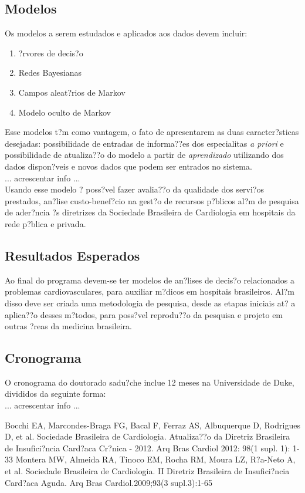 \documentclass{article}
\begin{document}
\subsection{ \label{subsec:modelos} Modelos}
Os modelos a serem estudados e aplicados aos dados devem incluir:
\begin{enumerate}
\item ?rvores de decis?o 
\item Redes Bayesianas 
\item Campos aleat?rios de Markov
\item Modelo oculto de Markov
\end{enumerate}
Esse modelos t?m como vantagem, o fato de apresentarem as duas caracter?sticas desejadas: possibilidade de entradas de informa??es dos especialitas \textit{a priori} e possibilidade de atualiza??o do modelo a partir de \textit{aprendizado} utilizando dos dados dispon?veis e novos dados que podem ser entrados no sistema.\\
{\color{red} ... acrescentar info ...}\\
Usando esse modelo ? poss?vel fazer avalia??o da qualidade dos servi?os prestados, an?lise custo-benef?cio na gest?o de recursos p?blicos al?m de pesquisa de ader?ncia ?s diretrizes da Sociedade Brasileira de Cardiologia em hospitais da rede p?blica e privada.

\subsection{ \label{sec:resultados} Resultados Esperados}
Ao final do programa devem-se ter modelos de an?lises de decis?o relacionados a problemas cardiovasculares, para auxiliar m?dicos em hospitais brasileiros. Al?m disso deve ser criada uma metodologia de pesquisa, desde as etapas iniciais at? a aplica??o desses m?todos, para poss?vel reprodu??o da pesquisa e projeto em outras ?reas da medicina brasileira.

\subsection{ \label{sec:cronograma} Cronograma}
O cronograma do doutorado sadu?che inclue 12 meses na Universidade de Duke, divididos da seguinte forma:\\
{\color{red} ... acrescentar info ...}


\clearpage

\begin{thebibliography}{9}
Bocchi EA, Marcondes-Braga FG, Bacal F, Ferraz AS, Albuquerque D, Rodrigues D, et al. Sociedade Brasileira de Cardiologia. Atualiza??o da Diretriz Brasileira de Insufici?ncia Card?aca Cr?nica - 2012. Arq Bras Cardiol 2012: 98(1 supl. 1): 1-33
Montera MW, Almeida RA, Tinoco EM, Rocha RM, Moura LZ, R?a-Neto A, et al.
Sociedade Brasileira de Cardiologia. II Diretriz Brasileira de Insufici?ncia Card?aca Aguda.
Arq Bras Cardiol.2009;93(3 supl.3):1-65
\end{thebibliography}
\end{document}
